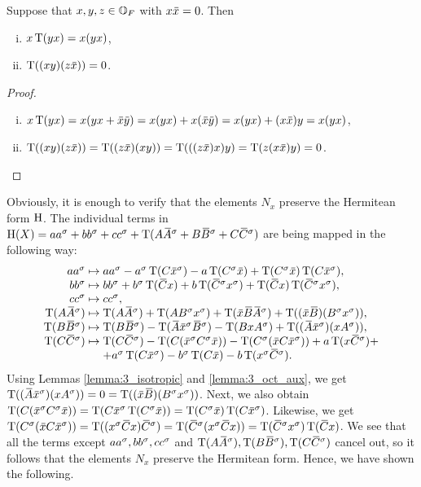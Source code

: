 \begin{lemma}
	\label{lemma:3_oct_aux}
	Suppose that $x,y,z \in \mathbb{O}_F$ with $x \mathord{\mbox{\hspace*{0pt}}\,\overline{\!x\!\!\;}\!\:}\mbox{\hspace*{0pt}}  = 0$. Then
		\begin{enumerate}[(i)]
			\item $x\operatorname{T}(yx) = x(yx)$,
			\item $\operatorname{T}( (xy)(z\mathord{\mbox{\hspace*{0pt}}\,\overline{\!x\!\!\;}\!\:}\mbox{\hspace*{0pt}} ) ) = 0$.		
		\end{enumerate}
\end{lemma}

\begin{proof}
	\leavevmode
	\begin{enumerate}[(i)]
	
	\item $x\Tr(yx) = x (yx + \ovx \ovy ) = x(yx) + x(\ovx \ovy )
		 = x(yx) + (x\ovx )y = x(yx)$,
		 
	\item $\Tr( (xy)(z\ovx ) ) = \Tr( (z\ovx ) (xy) ) = \Tr( ((z\ovx )x) y ) = 
		\Tr(z(x\ovx )y) = 0$. \qedhere
	\end{enumerate}
\end{proof}

Obviously, it is enough to verify that the elements $N_x$ preserve the Hermitean form $\mathrm{H}$. 
The individual terms in $\H(X) = aa^{\s} + bb^{\s} + cc^{\s} + \Tr(A\ovA ^{\s} + B\ovB ^{\s} +
C\ovC ^{\s})$ are being mapped in the following way:
\begin{equation}
	\begin{array}{r@{\;}c@{\;}l}
		aa^{\s} & \mapsto & aa^{\s} - a^{\s}\Tr(C\ovx ^{\s}) - a\Tr(C^{\s} \ovx ) 
					+ \Tr(C^{\s}\ovx ) \Tr(C\ovx ^{\s}), \\
		bb^{\s} & \mapsto & bb^{\s} + b^{\s}\Tr(\ovC x) + b\Tr(\ovC ^{\s}x^{\s}) +
					\Tr(\ovC x)\Tr(\ovC ^{\s}x^{\s}), \\
		cc^{\s} & \mapsto & cc^{\s}, \\
		\Tr(A\ovA ^{\s}) & \mapsto & \Tr(A\ovA ^{\s}) + \Tr(AB^{\s}x^{\s}) + 
					\Tr(\ovx \ovB \ovA ^{\s}) + 
					\Tr((\ovx \ovB )(B^{\s}x^{\s})), \\
		\Tr(B\ovB ^{\s}) & \mapsto & \Tr(B\ovB ^{\s}) - 
					\Tr(\ovA \ovx ^{\s} \ovB ^{\s}) - \Tr(BxA^{\s}) + 
					\Tr((\ovA \ovx ^{\s})(xA^{\s})), \\
		\Tr(C\ovC ^{\s}) & \mapsto & \Tr(C\ovC ^{\s}) - 
					\Tr(C(\ovx ^{\s}C^{\s}\ovx )) - \Tr(C^{\s}(\ovx C\ovx ^{\s}))
					+ a\Tr(x\ovC ^{\s}) + \\
					& & + a^{\s}\Tr(C\ovx ^{\s}) -
					b^{\s}\Tr(C\ovx ) - b\Tr(x^{\s}\ovC ^{\s}).
	\end{array}
\end{equation}
Using Lemmas \ref{lemma:3_isotropic} and
\ref{lemma:3_oct_aux}, we get
\mbox{$\Tr((\ovA \ovx ^{\s})(xA^{\s})) = 0= \Tr((\ovx \ovB )(B^{\s}x^{\s}))$}.
Next, we also obtain $\Tr(C( \ovx ^{\s} C^{\s} \ovx )) = \Tr(C \ovx ^{\s}
\Tr(C^{\sigma} \ovx )) = \Tr(C^{\sigma} \ovx )\Tr(C\ovx ^{\s})$. Likewise,
we get $\Tr(C^{\s}(\ovx C\ovx ^{\s})) = \Tr ((x^{\s}\ovC x)\ovC ^{\s}) = 
\Tr(\ovC ^{\s} (x^{\s}\ovC x)) = \Tr(\ovC ^{\s} x^{\s})\Tr(\ovC x)$. We see
that all the terms except $aa^{\sigma},bb^{\sigma},cc^{\sigma}$ and $\Tr(A\ovA ^{\s}),
\Tr(B\ovB ^{\s}), \Tr(C\ovC ^{\s})$ cancel out, so it follows that the elements
$N_x$ preserve the Hermitean form. Hence, we have shown the following. 

